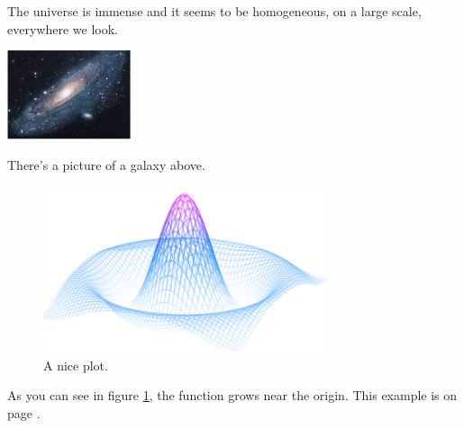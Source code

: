 \documentclass{article}
\begin{document}
The universe is immense and it seems to be homogeneous, on a large scale, everywhere we look.

\includegraphics{universe}  
 
There's a picture of a galaxy above.

\begin{figure}[h]
    \centering
    \includegraphics[width=0.75\textwidth]{mesh}
    \caption{A nice plot.}
    \label{fig:mesh1}
\end{figure} 

As you can see in figure \ref{fig:mesh1}, the function grows near the origin. This example is on page \pageref{fig:mesh1}.
\end{document}
